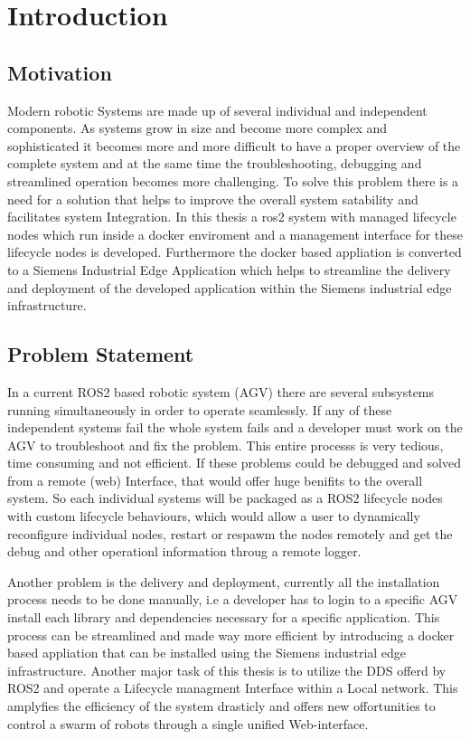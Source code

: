\chapter{Introduction}
\label{Introduction}

	\section{Motivation}
	\label{Introduction:Motivation}
	Modern robotic Systems are made up of several individual and independent components. As systems grow in size and become more complex and sophisticated it becomes more and more difficult to have a proper overview of the complete system and at the same time the troubleshooting, debugging and streamlined operation becomes more challenging. To solve this problem there is a need for a solution that helps to improve the overall system satability and facilitates system Integration. In this thesis a ros2 system with managed lifecycle nodes which run inside a docker enviroment and a management interface for these lifecycle nodes is developed. Furthermore the docker based appliation is converted to a Siemens Industrial Edge Application which helps to streamline the delivery and deployment of the developed application within the Siemens industrial edge infrastructure.
	
	\section{Problem Statement}
	\label{Introduction:Problem Statement}
	In a current ROS2 based robotic system (AGV) there are several subsystems running simultaneously in order to operate seamlessly. If any of these independent systems fail the whole system fails and a developer must work on the AGV to troubleshoot and fix the problem. This entire processs is very tedious, time consuming and not efficient. If these problems could be debugged and solved from a remote (web) Interface, that would offer huge benifits to the overall system. So each individual systems will be packaged as a ROS2 lifecycle nodes with custom lifecycle behaviours, which would allow a user to dynamically reconfigure individual nodes, restart or respawm the nodes remotely and get the debug and other operationl information throug a remote logger.

	Another problem is the delivery and deployment, currently all the installation process needs to be done manually, i.e a developer has to login to a specific AGV install each library and dependencies necessary for a specific application. This process can be streamlined and made way more efficient by introducing a docker based appliation that can be installed using the Siemens industrial edge infrastructure. Another major task of this thesis is to utilize the DDS offerd by ROS2 and operate a Lifecycle managment Interface within a Local network. This amplyfies the efficiency of the system drasticly and offers new offortunities to control a swarm of robots through a single unified Web-interface.
	
